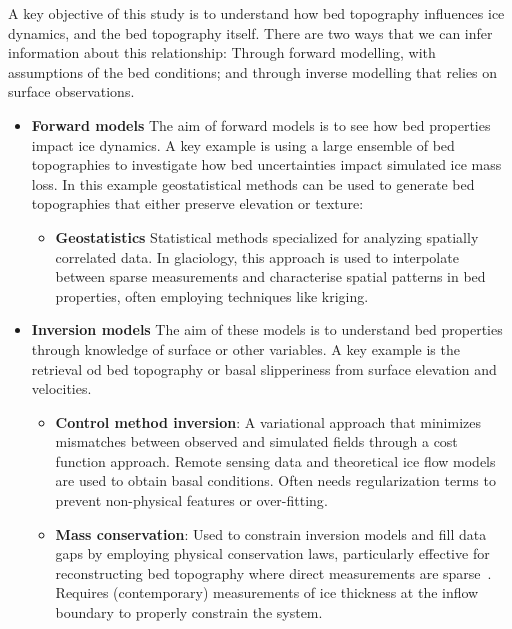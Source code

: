 A key objective of this study is to understand how bed topography influences ice dynamics, and the bed topography itself. There are two ways that we can infer information about this relationship: Through forward modelling, with assumptions of the bed conditions; and through inverse modelling that relies on surface observations.
\begin{itemize}
    \item\textbf{Forward models}
    The aim of forward models is to see how bed properties impact ice dynamics. A key example is using a large ensemble of bed topographies to investigate how bed uncertainties impact simulated ice mass loss. In this example geostatistical methods can be used to generate bed topographies that either preserve elevation or texture:    
    \begin{itemize}
            \item\textbf{Geostatistics} Statistical methods specialized for analyzing spatially correlated data. In glaciology, this approach is used to interpolate between sparse measurements and characterise spatial patterns in bed properties, often employing techniques like kriging\cite{Mackie_2020}.

    \end{itemize}

    \item\textbf{Inversion models}
    The aim of these models is to understand bed properties through knowledge of surface or other variables. A key example is the retrieval od bed topography or basal slipperiness from surface elevation and velocities.

        \begin{itemize}
            \item\textbf{Control method inversion}: A variational approach that minimizes mismatches between observed and simulated fields through a cost function approach. Remote sensing data and theoretical ice flow models are used to obtain basal conditions\cite{deRydt_2013}. Often needs regularization terms to prevent non-physical features or over-fitting\cite{Morlighem_Goldberg_2024}.

            \item\textbf{Mass conservation}: Used to constrain inversion models and fill data gaps by employing physical conservation laws, particularly effective for reconstructing bed topography where direct measurements are sparse~\cite{Morlighem_2017, Morlighem_2020}. Requires (contemporary) measurements of ice thickness at the inflow boundary to properly constrain the system\cite{Morlighem_Goldberg_2024}.


\end{itemize}
\end{itemize}
